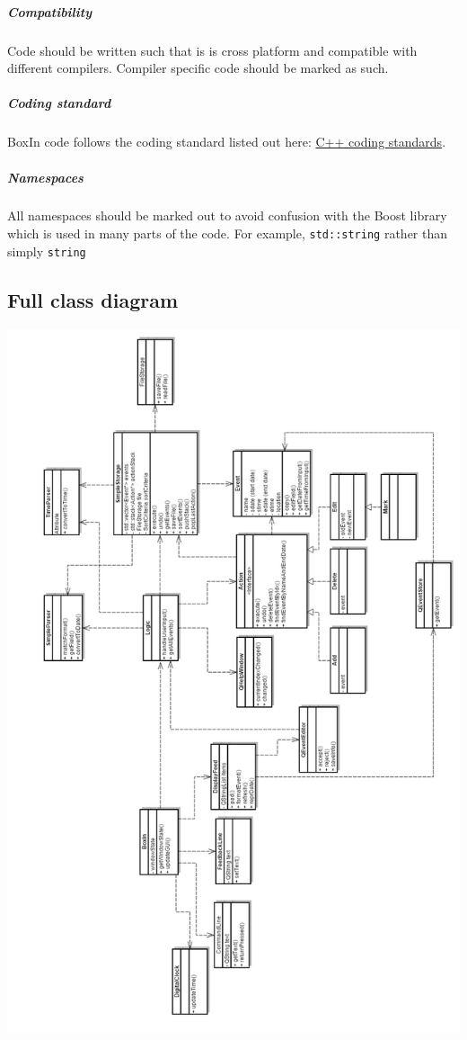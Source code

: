 \documentclass[12pt]{extarticle}
\begin{document}
\subparagraph{Compatibility}
Code should be written such that is is cross platform and compatible with different compilers. Compiler specific code should be marked as such.

\subparagraph{Coding standard}
BoxIn code follows the coding standard listed out here: \href{https://docs.google.com/document/pub?id=1tJD2XQo3hUb0SZniswLqg0vkmccv7vGBV7\_1AhTYK04\&amp\&embedded=true}{C++ coding standards}.

\subparagraph{Namespaces}
All namespaces should be marked out to avoid confusion with the Boost library which is used in many parts of the code. For example, \texttt{std::string} rather than simply \texttt{string}\\
\newpage
\subsection{Full class diagram}
\includegraphics[width=\textwidth, height=\textheight - 2cm]{class_diagram}
\end{document}
